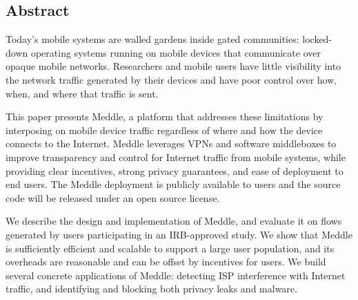 \subsection*{Abstract}
Today's mobile systems are walled gardens inside gated communities:  locked-down 
operating systems running on mobile devices that communicate over opaque mobile 
networks. Researchers and mobile users have little visibility into the network 
traffic generated by their devices and have poor control over how, when, and where that traffic is sent.

This paper presents Meddle, a platform that addresses these limitations by interposing on mobile 
device traffic regardless of where and how the device connects to the Internet. Meddle leverages 
VPNs and software middleboxes to improve transparency and control 
for Internet traffic from mobile systems, while providing clear incentives, strong privacy guarantees, 
and ease of deployment to end users.  The Meddle deployment is publicly available to users and 
the source code will be released under an open source license.

We describe the design and implementation of Meddle, and evaluate it on flows generated by 
users participating in an IRB-approved study.  We show that Meddle is sufficiently efficient 
and scalable to support a large user population, and its overheads are reasonable and can be offset 
by incentives for users.  We build several concrete applications of Meddle: detecting ISP interference with Internet traffic, 
and identifying and blocking both privacy leaks and malware.








